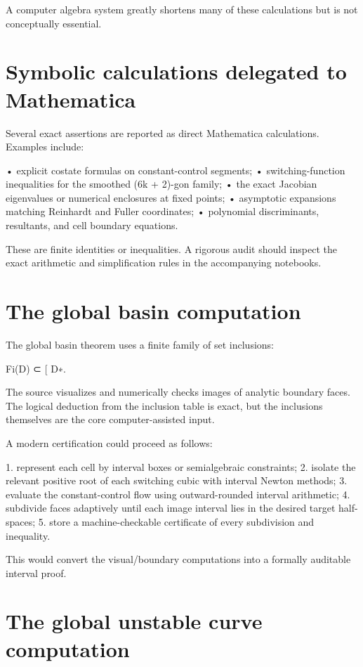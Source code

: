 A computer algebra system greatly shortens many of these calculations but is not conceptually essential.


\section{Symbolic calculations delegated to Mathematica}

Several exact assertions are reported as direct Mathematica calculations. Examples include:


• explicit costate formulas on constant-control segments; • switching-function inequalities for the smoothed (6k + 2)-gon family; • the exact Jacobian eigenvalues or numerical enclosures at fixed points; • asymptotic expansions matching Reinhardt and Fuller coordinates; • polynomial discriminants, resultants, and cell boundary equations.


These are finite identities or inequalities. A rigorous audit should inspect the exact arithmetic and simplification rules in the accompanying notebooks.


\section{The global basin computation}

The global basin theorem uses a finite family of set inclusions:


Fi(D) ⊂ [ D∗.


The source visualizes and numerically checks images of analytic boundary faces. The logical deduction from the inclusion table is exact, but the inclusions themselves are the core computer-assisted input.


A modern certification could proceed as follows:


1. represent each cell by interval boxes or semialgebraic constraints; 2. isolate the relevant positive root of each switching cubic with interval Newton methods; 3. evaluate the constant-control flow using outward-rounded interval arithmetic; 4. subdivide faces adaptively until each image interval lies in the desired target half-spaces; 5. store a machine-checkable certificate of every subdivision and inequality.


This would convert the visual/boundary computations into a formally auditable interval proof.


\section{The global unstable curve computation}

